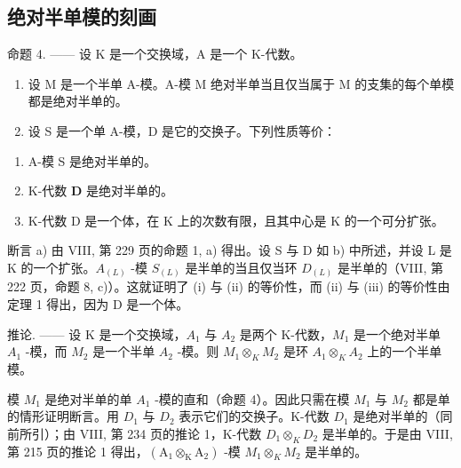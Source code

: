 \subsection{绝对半单模的刻画}

命题 4. —— 设 K 是一个交换域，A 是一个 K-代数。

\begin{enumerate}
\def\labelenumi{\alph{enumi})}
\item
  设 M 是一个半单 A-模。A-模 M 绝对半单当且仅当属于 M 的支集的每个单模都是绝对半单的。
\item
  设 S 是一个单 A-模，D 是它的交换子。下列性质等价：
\end{enumerate}

\begin{enumerate}
\def\labelenumi{(\roman{enumi})}
\item
  A-模 S 是绝对半单的。
\item
  K-代数 \(\mathbf{D}\) 是绝对半单的。
\item
  K-代数 D 是一个体，在 K 上的次数有限，且其中心是 K 的一个可分扩张。
\end{enumerate}

断言 a) 由 VIII, 第 229 页的命题 1, a) 得出。设 S 与 D 如 b) 中所述，并设 L 是 K 的一个扩张。\(A_{(L)}\) -模 \(S_{(L)}\) 是半单的当且仅当环 \(D_{(L)}\) 是半单的（VIII, 第 222 页，命题 8, c)）。这就证明了 (i) 与 (ii) 的等价性，而 (ii) 与 (iii) 的等价性由定理 1 得出，因为 D 是一个体。

推论. —— 设 K 是一个交换域，\(A_{1}\) 与 \(A_{2}\) 是两个 K-代数，\(M_{1}\) 是一个绝对半单 \(A_{1}\) -模，而 \(M_{2}\) 是一个半单 \(A_{2}\) -模。则 \(M_{1} \otimes_{K} M_{2}\) 是环 \(A_{1} \otimes_{K} A_{2}\) 上的一个半单模。

模 \(M_{1}\) 是绝对半单的单 \(A_{1}\) -模的直和（命题 4）。因此只需在模 \(M_{1}\) 与 \(M_{2}\) 都是单的情形证明断言。用 \(D_{1}\) 与 \(D_{2}\) 表示它们的交换子。K-代数 \(D_{1}\) 是绝对半单的（同前所引）；由 VIII, 第 234 页的推论 1，K-代数 \(D_{1} \otimes_{K} D_{2}\) 是半单的。于是由 VIII, 第 215 页的推论 1 得出，\((\mathrm{A}_{1} \otimes_{\mathrm{K}} \mathrm{A}_{2})\) -模 \(M_{1} \otimes_{K} M_{2}\) 是半单的。

